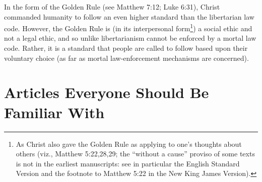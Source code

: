 \documentclass[letterpaper,12pt]{article}
\begin{document}
In the form of the Golden Rule (see Matthew 7:12; Luke 6:31), Christ commanded humanity to follow an even higher standard than the libertarian law code. However, the Golden Rule is (in its interpersonal form\footnote{As Christ also gave the Golden Rule as applying to one's thoughts about others (viz., Matthew 5:22,28,29; the ``without a cause'' proviso of some texts is not in the earliest manuscripts: see in particular the English Standard Version and the footnote to Matthew 5:22 in the New King James Version).}) a social ethic and not a legal ethic, and so unlike libertarianism cannot be enforced by a mortal law code. Rather, it is a standard that people are called to follow based upon their voluntary choice (as far as mortal law-enforcement mechanisms are concerned).

\appendix
\appendixpage

\section{Articles Everyone Should Be Familiar With}
\label{sec:AppendixArticlesEveryoneShouldBeFamiliarWith}
\end{document}
